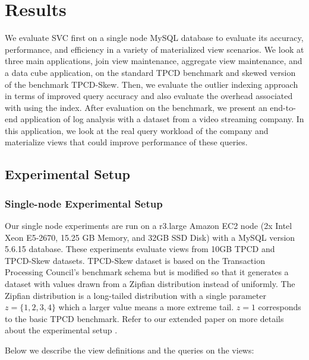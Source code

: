 \vspace{-.5em}
\section{Results}
\label{exp}
We evaluate SVC first on a single node MySQL database to evaluate its accuracy, performance, and efficiency in a variety of materialized view 
scenarios.
We look at three main applications, join view maintenance, aggregate view maintenance, and a data cube application, on the standard TPCD benchmark 
and skewed version of the benchmark TPCD-Skew.
Then, we evaluate the outlier indexing approach in terms of improved query accuracy and also evaluate the overhead associated with using the index.
After evaluation on the benchmark, we present an end-to-end application of log analysis with a dataset from a video streaming company.
In this application, we look at the real query workload of the company and materialize views that could improve performance of these queries.

\subsection{Experimental Setup}\vspace{-.5em}
\subsubsection{Single-node Experimental Setup}
Our single node experiments are run on a r3.large Amazon EC2 node (2x Intel Xeon E5-2670, 15.25 GB Memory, and 32GB SSD Disk) with a MySQL version 5.6.15 database.
These experiments evaluate views from 10GB TPCD and TPCD-Skew datasets.
TPCD-Skew dataset \cite{tpcdskew} is based on the Transaction Processing Council's benchmark
schema but is modified so that it generates a dataset with values drawn from a Zipfian distribution instead of uniformly.
The Zipfian distribution \cite{mitzenmacher2004brief} is a long-tailed distribution with a single parameter $z=\{1,2,3,4\}$ which a larger
value means a more extreme tail.
$z=1$ corresponds to the basic TPCD benchmark. 
Refer to our extended paper on more details about the experimental setup .

Below we describe the view definitions and the queries on the views:

